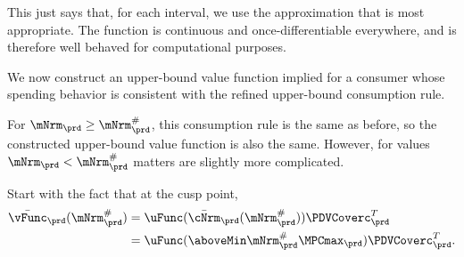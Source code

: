 \documentclass[titlepage, headings=optiontotocandhead]{econark}
\begin{document}


  This just says that, for each interval, we use the approximation that
  is most appropriate.  The function is continuous and
  once-differentiable everywhere, and is therefore well behaved for
  computational purposes.
  \begin{comment}
    In practice, in our problem the difference due to this refinement is displayed in Figure \ref{fig:IntExpFOCInvPesReaOpt45GapPlot}.
    \hypertarget{IntExpFOCInvPesReaOpt45GapPlot}{}
    \begin{figure}
      \texttt{[image: ./Figures/IntExpFOCInvPesReaOpt45GapPlot]}
      \caption{Difference Between $\Aprx{\Max{\cFunc}}_{L, T-1}$ and $\Aprx{\Max{\cFunc}}_{H,T-1}$ is Small}
      \label{fig:IntExpFOCInvPesReaOpt45GapPlot}
    \end{figure}
  \end{comment}

  We now construct an upper-bound value function implied for a consumer whose spending behavior is consistent with the refined upper-bound consumption rule.

  For $\mNrm_{\prd} \geq \mNrm_{\prd}^{\#}$, this consumption rule is the same as before,
  so the constructed upper-bound value function is also the same.  However, for
  values $\mNrm_{\prd} < \mNrm_{\prd}^{\#}$ matters are slightly more complicated.

  Start with the fact that at the cusp point,
  \begin{equation*}\begin{gathered}\begin{aligned}
        \bar{\vFunc}_{\prd}(\mtCusp)  & = \uFunc(\bar{\cNrm}_{\prd}(\mtCusp))\PDVCoverc_{\prd}^T \\
        & =  \uFunc(\aboveMin \mtCusp  \MPCmax_{\prd})\PDVCoverc_{\prd}^{T}
        .
      \end{aligned}\end{gathered}\end{equation*}
\end{document}
